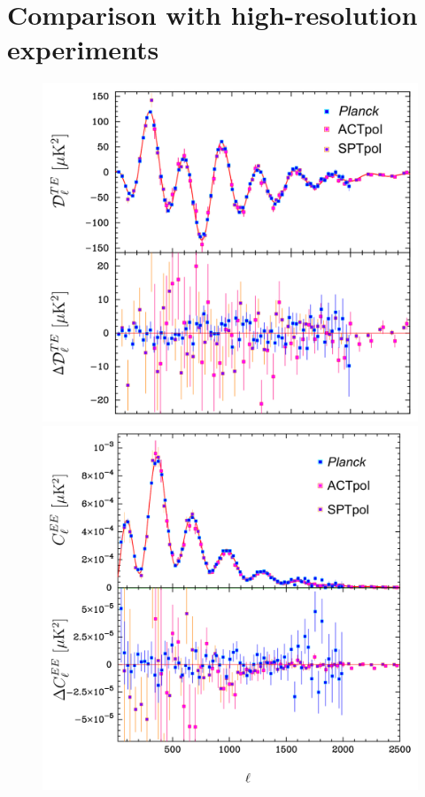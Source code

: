 \documentclass[longauth,traditabstract]{aa}
\begin{document}
\section{Comparison with high-resolution experiments}\label{sec:highell}
\begin{figure}[htbp!]
\begin{center}
\centering
\hspace{-3mm}\includegraphics[width=0.965\columnwidth]{planck_spt_TEplik_new.pdf} \\
\includegraphics[width=\columnwidth]{planck_spt_EEplik_new.pdf}

\end{center}
\end{figure}
\end{document}
